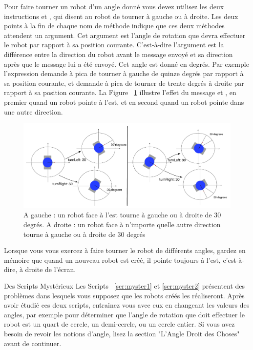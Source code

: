 \documentclass[a4paper,10pt,twoside]{book}
\begin{document}
Pour faire tourner un robot d'un angle donn\'e vous devez utilisez les deux instructions  et 
, qui disent au robot de tourner \`a gauche ou \`a droite. Les deux points \`a la fin de chaque 
nom de m\'ethode indique que ces deux m\'ethodes attendent un argument. Cet argument est l'angle de rotation 
que devra effectuer le robot par rapport \`a sa position courante. C'est-\`a-dire l'argument est la diff\'erence 
entre la direction du robot avant le message envoy\'e et sa direction apr\`es que le message lui a \'et\'e envoy\'e. 
Cet angle est donn\'e en degr\'es. Par exemple l'expression  
demande \`a pica de tourner \`a gauche de quinze degr\'es par rapport \`a sa position courante, et  
demande \`a pica de tourner de trente degr\'es \`a droite par rapport \`a sa position courante. La Figure ~\ref{fig:turnLeftBoth} 
illustre l'effet du message  et , en premier quand un robot pointe \`a l'est, et en second quand un robot pointe dans une autre direction.

\begin{figure}
\begin{center}\includegraphics[width=12cm]{turnLeftBoth}
\caption{A gauche : un robot  face \`a l'est tourne \`a gauche ou \`a droite de 30 degr\'es. A droite : un robot face \`a n'importe 
quelle autre direction tourne \`a gauche ou \`a droite de 30 degr\'es \label{fig:turnLeftBoth}}
\end{center}
\end{figure}

Lorsque vous vous exercez \`a faire tourner le robot de diff\'erents angles, 
gardez en m\'emoire que quand un nouveau robot est cr\'e\'e, il pointe toujours \`a l'est, c'est-\`a-dire, \`a droite de l'\'ecran.




\begin{exonofig}{Des Scripts Myst\'erieux}
Les Scripts ~\ref{scr:myster1} et \ref{scr:myster2} pr\'esentent des probl\`emes dans lesquels vous supposez que les robots cr\'e\'es les r\'ealiseront. Apr\`es avoir \'etudi\'e ces deux scripts, entrainez vous avec eux en changeant les valeurs des angles, par exemple pour d\'eterminer que l'angle de rotation que doit effectuer le robot est un quart de cercle, un demi-cercle, ou un cercle entier. Si vous avez besoin de revoir les notions d'angle, lisez la section "L'Angle Droit des Choses" avant de continuer.
\end{exonofig}
\end{document}
